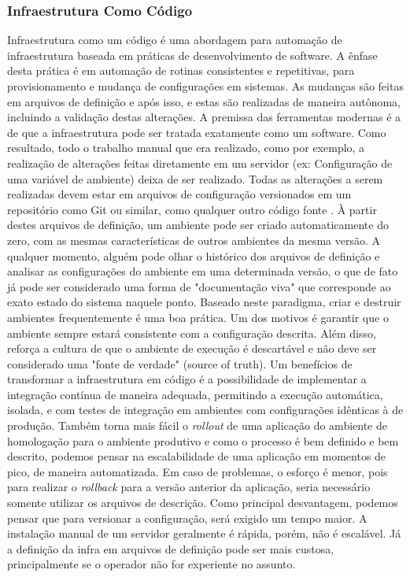 \documentclass[twoside,english,brazilian]{UNISINOSartigo}
\begin{document}
\subsubsection{Infraestrutura Como Código}
Infraestrutura como um código é uma abordagem para automação de infraestrutura baseada em práticas de desenvolvimento de software. A ênfase desta prática é em automação de rotinas consistentes e repetitivas, para provisionamento e mudança de configurações em sistemas. As mudanças são feitas em arquivos de definição e após isso, e estas são realizadas de maneira autônoma, incluindo a validação destas alterações.
A premissa das ferramentas modernas é a de que a infraestrutura pode ser tratada exatamente como um software.  Como resultado, todo o trabalho manual que era realizado, como por exemplo, a realização de alterações feitas diretamente em um servidor (ex: Configuração de uma variável de ambiente) deixa de ser realizado. Todas as alterações a serem realizadas devem estar em arquivos de configuração versionados em um repositório como Git ou similar, como qualquer outro código fonte \citep{Morris2016}. \newline
À partir destes arquivos de definição, um ambiente pode ser criado automaticamente do zero, com as mesmas características de outros ambientes da mesma versão. A qualquer momento, alguém pode olhar o histórico dos arquivos de definição e analisar as configurações do ambiente em uma determinada versão, o que de fato já pode ser considerado uma forma de "documentação viva" que corresponde ao exato estado do sistema naquele ponto.	\newline 
Baseado neste paradigma, criar e destruir ambientes frequentemente é uma boa prática. Um dos motivos é garantir que o ambiente sempre estará consistente com a configuração descrita. Além disso, reforça a cultura de que o ambiente de execução é descartável e não deve ser considerado uma "fonte de verdade" (source of truth).
Um benefícios de transformar a infraestrutura em código é a possibilidade de implementar a integração contínua de maneira adequada, permitindo a execução automática, isolada, e com testes de integração em ambientes com configurações idênticas à de produção. Também torna mais fácil o \textit{rollout} de uma aplicação do ambiente de homologação para o ambiente produtivo e como o processo é bem definido e bem descrito, podemos pensar na escalabilidade de uma aplicação em momentos de pico, de maneira automatizada. Em caso de problemas, o esforço é menor, pois para realizar o \textit{rollback} para a versão anterior da aplicação, seria necessário somente utilizar os arquivos de descrição. \newline
Como principal desvantagem, podemos pensar que para versionar a configuração, será exigido um tempo maior. A instalação manual de um servidor geralmente é rápida, porém, não é escalável. Já a definição da infra em arquivos de definição pode ser mais custosa, principalmente se o operador não for experiente no assunto.
\end{document}
